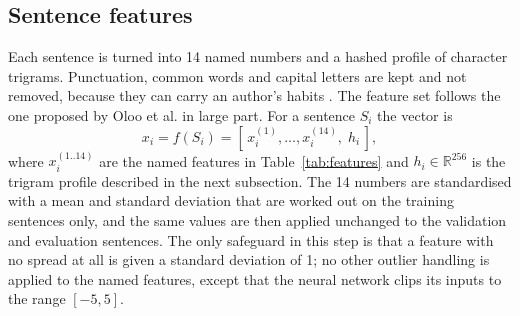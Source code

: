 \documentclass[runningheads]{llncs}
\begin{document}
\subsection{Sentence features}

Each sentence is turned into 14 named numbers and a hashed profile of character trigrams. Punctuation, common words and capital letters are kept and not removed, because they can carry an author's habits \cite{zamir2024stylometry}. The feature set follows the one proposed by Oloo et al. \cite{oloo2022optimal} in large part. For a sentence $S_i$ the vector is
\begin{equation}
x_i = f(S_i) = [\,x_i^{(1)},\ldots,x_i^{(14)},\; h_i\,],
\label{eq:sentvec}
\end{equation}
where $x_i^{(1..14)}$ are the named features in Table~\ref{tab:features} and $h_i\in\mathbb{R}^{256}$ is the trigram profile described in the next subsection. The 14 numbers are standardised with a mean and standard deviation that are worked out on the training sentences only, and the same values are then applied unchanged to the validation and evaluation sentences. The only safeguard in this step is that a feature with no spread at all is given a standard deviation of 1; no other outlier handling is applied to the named features, except that the neural network clips its inputs to the range $[-5,5]$.
\end{document}

